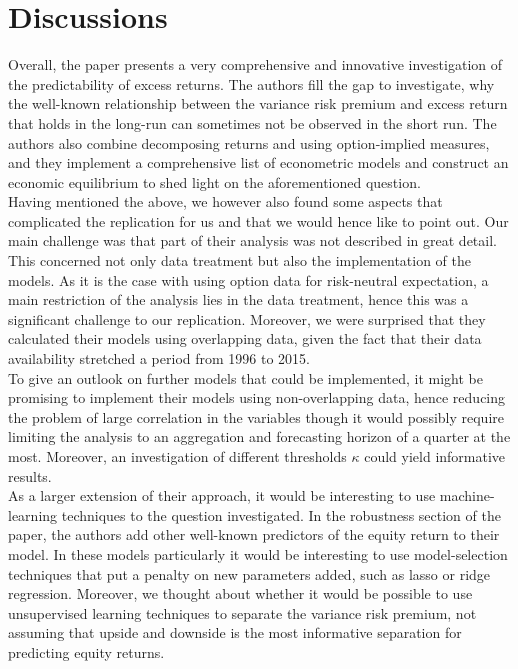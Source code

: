 
\section{Discussions}\label{sec:chapter5}

Overall, the paper presents a very comprehensive and innovative investigation of the predictability of excess returns. The authors fill the gap to investigate, why the well-known relationship between the variance risk premium and excess return that holds in the long-run can sometimes not be observed in the short run. The authors also combine decomposing returns and using option-implied measures, and they implement a comprehensive list of econometric models and construct an economic equilibrium to shed light on the aforementioned question.\\

Having mentioned the above, we however also found some aspects that complicated the replication for us and that we would hence like to point out. Our main challenge was that part of their analysis was not described in great detail. This concerned not only data treatment but also the implementation of the models. As it is the case with using option data for risk-neutral expectation, a main restriction of the analysis lies in the data treatment, hence this was a significant challenge to our replication. Moreover, we were surprised that they calculated their models using overlapping data, given the fact that their data availability stretched a period from 1996 to 2015.\\

To give an outlook on further models that could be implemented, it might be promising to implement their models using non-overlapping data, hence reducing the problem of large correlation in the variables though it would possibly require limiting the analysis to an aggregation and forecasting horizon of a quarter at the most. Moreover, an investigation of different thresholds $\kappa$ could yield informative results.\\

As a larger extension of their approach, it would be interesting to use machine-learning techniques to the question investigated. In the robustness section of the paper, the authors add other well-known predictors of the equity return to their model. In these models particularly it would be interesting to use model-selection techniques that put a penalty on new parameters added, such as lasso or ridge regression. Moreover, we thought about whether it would be possible to use unsupervised learning techniques to separate the variance risk premium, not assuming that upside and downside is the most informative separation for predicting equity returns.
